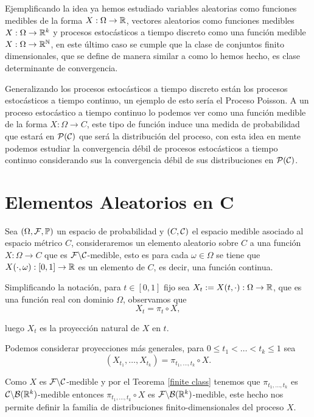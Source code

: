 \documentclass[12pt,oneside]{book}
\newcounter{obs}[chapter]
\numberwithin{equation}{chapter}
\begin{document}
Ejemplificando la idea ya hemos estudiado variables aleatorias como funciones medibles de la forma $X:\Omega\to \R$, vectores aleatorios como funciones medibles $X:\Omega\to\R^k$ y procesos estocásticos a tiempo discreto como una función medible $X:\Omega\to\R^{\N}$, en este último caso se cumple que la clase de conjuntos finito dimensionales, que se define de manera similar a como lo hemos hecho, es clase determinante de convergencia.

Generalizando los procesos estocásticos a tiempo discreto están los procesos estocásticos a tiempo continuo, un ejemplo de esto sería el Proceso Poisson. A un proceso estocástico a tiempo continuo lo podemos ver como una función medible de la forma $X:\Omega\to C$, este tipo de función induce una medida de probabilidad que estará en $\Po(\ca C)$ que será la distribución del proceso, con esta idea en mente podemos estudiar la convergencia débil de procesos estocásticos a tiempo continuo considerando sus la convergencia débil de sus distribuciones en $\Po(\ca C)$. 


\section{Elementos Aleatorios en C}

Sea $\ofp$ un espacio de probabilidad y $(C,{\cal C})$ el espacio medible asociado al espacio métrico $C$, consideraremos un elemento aleatorio sobre $C$ a una función $X:\Omega\to C$ que es ${\cal F}\backslash {\cal C}$-medible, esto es para cada $\omega\in\Omega$ se tiene que $X(\cdot,\omega):[0,1]\rightarrow\R$ es un elemento de $C$, es decir, una función continua.

Simplificando la notación, para $t\in [0,1]$ fijo  sea $X_t:=X(t,\cdot):\Omega\rightarrow\R$, que es una función real con dominio $\Omega$, observamos que 
\begin{equation*}
    X_t=\pi_t\circ X,
\end{equation*}

luego $X_t$ es la proyección natural de $X$ en $t$. 

Podemos considerar proyecciones más generales, para $0\leq t_1<\dots<t_k\leq 1$ sea 
\begin{equation*}
    (X_{t_1},\dots,X_{t_k})=\pi_{t_1,\dots,t_k}\circ X.
\end{equation*}

Como $X$ es ${\cal F}\backslash{\cal C}$-medible y por el Teorema \ref{finite class} tenemos que $\pi_{t_1,\dots,t_k}$ es $\ca C\backslash\ca B(\R^k)$-medible entonces $\pi_{t_1,\dots,t_k}\circ X$ es $\ca F\backslash\ca B(\R^k)$-medible, este hecho nos permite definir la familia de distribuciones finito-dimensionales del proceso $X$.
\end{document}
